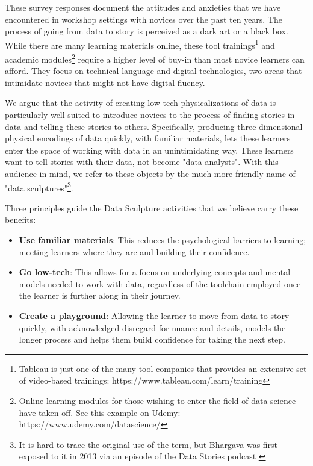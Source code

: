 \documentclass{sigchi-ext}
\begin{document}
These survey responses document the attitudes and anxieties that we have encountered in workshop settings with novices over the past ten years. The process of going from data to story is perceived as a dark art or a black box. While there are many learning materials online, these tool trainings\footnote{Tableau is just one of the many tool companies that provides an extensive set of video-based trainings: https://www.tableau.com/learn/training} and academic modules\footnote{Online learning modules for those wishing to enter the field of data science have taken off.  See this example on Udemy: https://www.udemy.com/datascience/} require a higher level of buy-in than most novice learners can afford.  They focus on technical language and digital technologies, two areas that intimidate novices that might not have digital fluency.

We argue that the activity of creating low-tech physicalizations of data is particularly well-suited to introduce novices to the process of finding stories in data and telling these stories to others. Specifically, producing three dimensional physical encodings of data quickly, with familiar materials, lets these learners enter the space of working with data in an unintimidating way. These learners want to tell stories with their data, not become "data analysts".  With this audience in mind, we refer to these objects by the much more friendly name of  "data sculptures"\footnote{It is hard to trace the original use of the term, but Bhargava was first exposed to it in 2013 via an episode of the Data Stories podcast \cite{Bertini_Stefaner}}.

Three principles guide the Data Sculpture activities that we believe carry these benefits:
\begin{itemize}
  \item \textbf{Use familiar materials}: This reduces the psychological barriers to learning; meeting learners where they are and building their confidence.
  \item \textbf{Go low-tech}: This allows for a focus on underlying concepts and mental models needed to work with data, regardless of the toolchain employed once the learner is further along in  their journey.
  \item \textbf{Create a playground}: Allowing the learner to move from data to story quickly, with acknowledged disregard for nuance and details, models the longer process and helps them build confidence for taking the next step.
\end{itemize}
\end{document}
